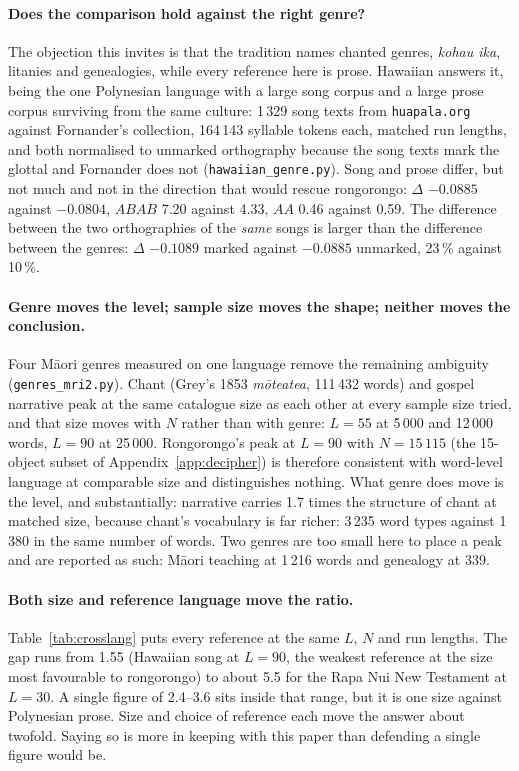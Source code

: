 \documentclass[11pt,a4paper]{article}
\begin{document}
\paragraph{Does the comparison hold against the right genre?} The objection this invites is that the tradition names chanted genres, \emph{kohau ika}, litanies and genealogies, while every reference here is prose. Hawaiian answers it, being the one Polynesian language with a large song corpus and a large prose corpus surviving from the same culture: 1\,329 song texts from \texttt{huapala.org} against Fornander's collection, 164\,143 syllable tokens each, matched run lengths, and both normalised to unmarked orthography because the song texts mark the glottal and Fornander does not (\texttt{hawaiian\_genre.py}). Song and prose differ, but not much and not in the direction that would rescue rongorongo: $\Delta$ $-0.0885$ against $-0.0804$, $ABAB$ 7.20 against 4.33, $AA$ 0.46 against 0.59. The difference between the two orthographies of the \emph{same} songs is larger than the difference between the genres: $\Delta$ $-0.1089$ marked against $-0.0885$ unmarked, 23\,\% against 10\,\%.

\paragraph{Genre moves the level; sample size moves the shape; neither moves the conclusion.} Four M\=aori genres measured on one language remove the remaining ambiguity (\texttt{genres\_mri2.py}). Chant (Grey's 1853 \emph{m\=oteatea}, 111\,432 words) and gospel narrative peak at the same catalogue size as each other at every sample size tried, and that size moves with $N$ rather than with genre: $L=55$ at 5\,000 and 12\,000 words, $L=90$ at 25\,000. Rongorongo's peak at $L=90$ with $N=15\,115$ (the 15-object subset of Appendix~\ref{app:decipher}) is therefore consistent with word-level language at comparable size and distinguishes nothing. What genre does move is the level, and substantially: narrative carries 1.7 times the structure of chant at matched size, because chant's vocabulary is far richer: 3\,235 word types against 1\,380 in the same number of words. Two genres are too small here to place a peak and are reported as such: M\=aori teaching at 1\,216 words and genealogy at 339.

\paragraph{Both size and reference language move the ratio.} Table~\ref{tab:crosslang} puts every reference at the same $L$, $N$ and run lengths. The gap runs from 1.55 (Hawaiian song at $L=90$, the weakest reference at the size most favourable to rongorongo) to about 5.5 for the Rapa Nui New Testament at $L=30$. A single figure of 2.4--3.6 sits inside that range, but it is one size against Polynesian prose. Size and choice of reference each move the answer about twofold. Saying so is more in keeping with this paper than defending a single figure would be.
\end{document}
